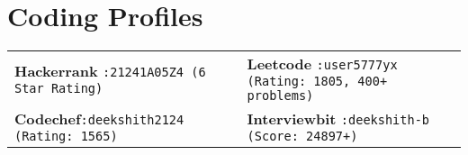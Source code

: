 \documentclass[a4paper,10pt]{article}
\newcommand{\sectionheader}[2]{%
    \begin{center}
        \textcolor{myblue}{\Huge #1} \\[6pt]
        \textcolor{mydarkblue}{\underline{\href{#2}{\raisebox{-0.05\height}{\faGithub} GitHub}} $|$}
        \textcolor{mydarkblue}{\underline{\href{https://www.linkedin.com/in/deekshith-bommarthi/}{\raisebox{-0.05\height}{\faLinkedin} LinkedIn}}}
    \end{center}
}
\newcommand{\sectionheader}[2]{%
    \begin{center}
        \vspace*{-\baselineskip} %
        \textcolor{myblue}{\Huge #1} \\[6pt]
        \vspace{-8pt} %
        \textcolor{mydarkblue}{\underline{\href{#2}{\raisebox{-0.05\height}{\faGithub} GitHub}} $|$}
        \textcolor{mydarkblue}{\underline{\href{https://www.linkedin.com/in/deekshith-bommarthi/}{\raisebox{-0.05\height}{\faLinkedin} LinkedIn}}}
    \end{center}
}
\begin{document}
\newcommand{\activities}[1]{%
    \begin{tabularx}{\linewidth}{@{} X @{}}
        \color{myblue} \textbf{Activities} \\
        \begin{itemize}[nosep, after=\strut, leftmargin=2em, itemsep=2pt]
            #1
        \end{itemize}
    \end{tabularx}
    \vspace{1pt}
}
\titleformat{\section}{\Large\scshape\color{myblue}\centering}{}{0em}{}[\titlerule]
\titlespacing{\section}{0pt}{2pt}{2pt}

\newcommand{\sectionheader}[2]{%
    \begin{center}
        \textcolor{myblue}{\Huge #1} \\[6pt]
        \textcolor{mydarkblue}{\underline{\href{#2}{\raisebox{-0.05\height}{\faGithub} GitHub}} $|$}
        \textcolor{mydarkblue}{\underline{\href{https://www.linkedin.com/in/deekshith-b-1a09b9297/}{\raisebox{-0.05\height}{\faLinkedin} LinkedIn}}}
    \end{center}
}
\vspace{2pt}
\section{Coding Profiles}

\begin{flushleft}
\begin{tabular}{l l}
    \textbf{Hackerrank} \texttt{:21241A05Z4 (6 Star Rating)} & \textbf{Leetcode} \hspace{17pt}\texttt{:user5777yx (Rating: 1805, 400+ problems)} \\
    \textbf{Codechef}\hspace{14pt}\texttt{:deekshith2124 (Rating: 1565)} & \textbf{Interviewbit} \texttt{:deekshith-b\textunderscore 240 (Score: 24897+)} \\
\end{tabular}
\end{flushleft}
\vspace{-1pt}
\end{document}
